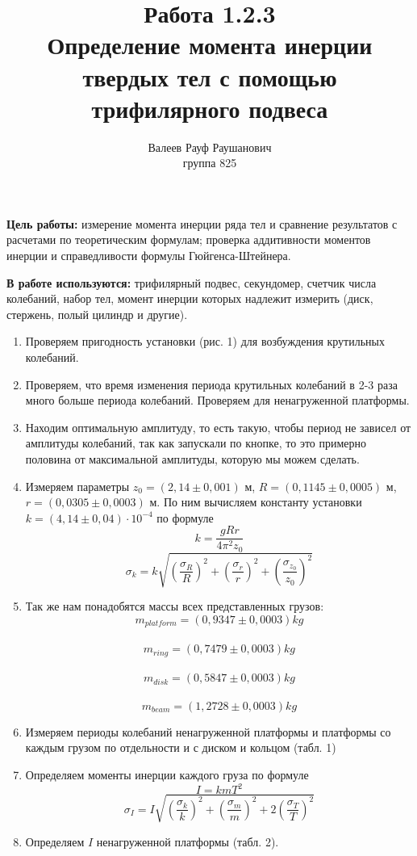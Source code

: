 \documentclass[a4paper, 12pt]{article}%
\author{Валеев Рауф Раушанович \\
группа 825}
\title{\textbf{Работа 1.2.3 \\
Определение момента инерции твердых тел с помощью трифилярного подвеса}}
\begin{document}
\maketitle
\newpage
\textbf{Цель работы:} измерение момента инерции ряда тел и сравнение результатов с расчетами по теоретическим формулам; проверка аддитивности моментов инерции и справедливости формулы Гюйгенса-Штейнера.

\textbf{В работе используются:} трифилярный подвес, секундомер, счетчик числа колебаний, набор тел, момент инерции которых надлежит измерить (диск, стержень, полый цилиндр и другие).
\begin{enumerate}
\item Проверяем пригодность установки (рис. 1) для возбуждения крутильных колебаний. 
\item Проверяем, что время изменения периода крутильных колебаний в 2-3 раза много больше периода колебаний. Проверяем для ненагруженной платформы. 
\item Находим оптимальную амплитуду, то есть такую, чтобы период не зависел от амплитуды колебаний, так как запускали по кнопке, то это примерно половина от максимальной амплитуды, которую мы можем сделать. 
\item Измеряем параметры $z_0 = (2,14 \pm 0,001)$ м, $R = (0,1145 \pm 0,0005)$ м, $r = (0,0305 \pm 0,0003)$ м. По ним вычисляем константу установки $k = (4,14 \pm 0,04 ) \cdot 10 ^ {-4}$ по формуле 
\[ k = \dfrac{gRr}{4 \pi^2 z_0} \]
\[ \sigma_k = k  \sqrt{\left( \dfrac{\sigma_R}{R}\right)^2 + \left( \dfrac{\sigma_r}{r}\right)^2 + \left( \dfrac{\sigma_{z_0}}{z_0}\right)^2}\]
\item Так же нам понадобятся массы всех представленных грузов: 
\[m_{platform} = (0,9347 \pm 0,0003) kg \] \\
\[  m_{ring} = (0,7479 \pm 0,0003) kg \] \\ 
\[m_{disk} = (0,5847 \pm 0,0003) kg \] \\ 
\[ m_{beam} = (	1,2728 \pm 0,0003) kg\]
\item Измеряем периоды колебаний ненагруженной платформы и платформы со каждым грузом по отдельности и с диском и кольцом (табл. 1)
\item Определяем моменты инерции каждого груза по формуле 
\[I = kmT^2\]
\[ \sigma_I = I \sqrt{\left( \dfrac{\sigma_k}{k} \right)^2 + \left( \dfrac{\sigma_m}{m}\right)^2 + 2 \left( \dfrac{\sigma_T}{T}\right)^2} \]
\item Определяем $I$ ненагруженной платформы (табл. 2).

\end{enumerate}
\end{document}
